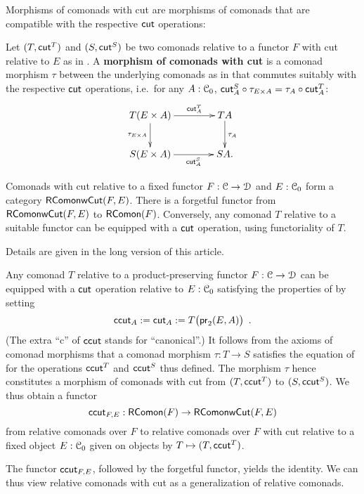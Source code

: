\documentclass[a4paper,USenglish]{lipics}
\newcommand{\fat}[1]{\textbf{#1}}
\begin{document}
Morphisms of comonads with cut are morphisms of comonads that are compatible with the respective $\cut$ operations:

\begin{defn}%
\label{def:morphism_comonad_cut}
 Let $(T,\cut^T)$ and $(S,\cut^S)$ be two comonads relative to a functor $F$ with cut relative to $E$ as in .
 A \fat{morphism of comonads with cut} is a comonad morphism $\tau$ between the underlying comonads as in  that 
 commutes suitably with the respective $\cut$ operations, i.e.\ for any $A : \C_0$,
  $\comp{\tau_{E \times A}}{\cut^S_A}  = \comp{\cut^T_A}{\tau_A}$:
\[
 \begin{xy}
  \xymatrix@C=4em{
                 T(E\times A)   \ar[r]^-{\cut^T_A} \ar[d]_{\tau_{E \times A}}  & TA \ar[d]^{\tau_{A}}\\
                 S(E \times A)  \ar[r]_-{\cut^S_A}   & S A.
  }
 \end{xy}
\]

\end{defn}


Comonads with cut relative to a fixed functor $F:\C\to\D$ and $E:\C_0$ form a category $\RComonadWC(F,E)$.
There is a forgetful functor from $\RComonadWC(F,E)$ to $\RComonad(F)$.
Conversely, any comonad $T$ relative to a suitable functor can be equipped with a $\cut$ operation, using functoriality of $T$.
%
\begin{Short}
 Details are given in the long version of this article.
\end{Short}

\begin{Long}
\begin{rem}\label{canonical_cut}
 Any comonad $T$ relative to a product-preserving functor $F:\C\to\D$  can be equipped with a $\cut$ operation relative to 
 $E:\C_0$ satisfying the properties of  by setting
   \[ \ccut_A := \cut_A := T\bigl(\pr_2(E,A)\bigr) \enspace . \]
 (The extra \enquote{c} of $\ccut$ stands for \enquote{canonical}.)
 It follows from the axioms of comonad morphisms that a comonad morphism $\tau : T\to S$ satisfies the equation of  
 for the  operations $\ccut^T$ and $\ccut^S$ thus defined. The morphism $\tau$ hence constitutes a morphism of comonads with cut from $(T,\ccut^T)$ to $(S,\ccut^S)$.
 We thus obtain a functor 
 \[ \ccut_{F,E} : \RComonad(F) \to \RComonadWC(F,E)\]
 from relative comonads over $F$ to relative comonads over $F$ with cut relative to a fixed object $E:\C_0$ given on 
 objects by $T\mapsto (T,\ccut^T)$.
\end{rem}

The functor $\ccut_{F,E}$, followed by the forgetful functor, yields the identity. We can thus view
relative comonads with cut as a generalization of relative comonads.
\end{Long}
\end{document}
